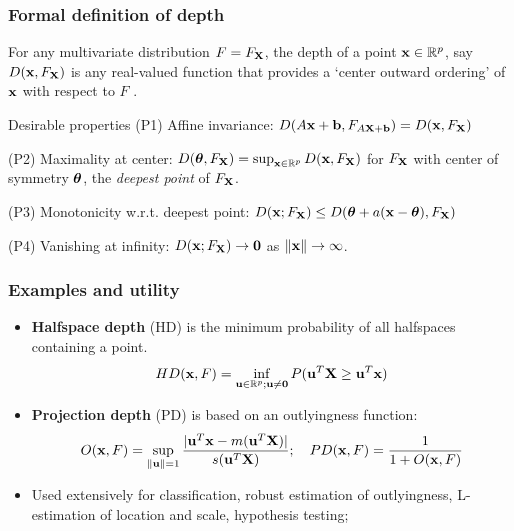 \documentclass[handout,10pt]{beamer}
\begin{document}
\begin{frame}
\frametitle{Formal definition of depth}
For any multivariate distribution $F = F_{\mathbf{X}}$, the depth of a point ${\bf{x}} \in \mathbb{R}^p$, say $D({\bf{x}}, F_{\mathbf{X}})$ is any real-valued function that provides a `center outward ordering' of ${\bf{x}}$ with respect to $F$ \citep{zuo00}.

\vspace{.5cm}
\begin{block}{Desirable properties \citep{liu90}}
(P1) {\colbit Affine invariance}: $D(A{\bf{x}} + {\bf{b}}, F_{A{\mathbf{X}}+{\bf{b}}}) = D({\bf{x}}, F_{\mathbf{X}})$
\vspace{.2cm}

(P2) {\colbit Maximality at center}: $D({\boldsymbol{\theta}}, F_{\mathbf{X}}) = \sup_{{\bf{x}}\in \mathbb{R}^p} D({\bf{x}}, F_{\mathbf{X}})$ for $F_{\mathbf{X}}$ with center of symmetry ${\boldsymbol{\theta}}$, the \textit{deepest point} of $F_{\mathbf{X}}$.
\vspace{.2cm}

(P3) {\colbit Monotonicity w.r.t. deepest point}: $D({\bf{x}}; F_{\mathbf{X}}) \leq D({\boldsymbol{\theta}} + a({\bf{x}} - {\boldsymbol{\theta}}), F_{\mathbf{X}})$
\vspace{.5cm}

(P4) {\colbit Vanishing at infinity}: $D({\bf{x}}; F_{\mathbf{X}}) \rightarrow \bf0$ as $\|{\bf{x}}\| \rightarrow \infty $.
\end{block}
\end{frame}


\begin{frame}
\frametitle{Examples and utility}
\begin{itemize}
\item \textbf{Halfspace depth} (HD) \citep{tukey75} is the minimum probability of all halfspaces containing a point.
$$ HD({\bf{x}}, F)  = \inf_{{\bf{u}} \in \mathbb{R}^p; {\bf{u}} \neq \bf0} P({\bf{u}}^T {\mathbf{X}} \geq {\bf{u}}^T {\bf{x}}) $$

\item \textbf{Projection depth} (PD) \citep{zuo03} is based on an outlyingness function:
$$ O({\bf{x}}, F) = \sup_{\| {\bf{u}} \| = 1} \frac{| {\bf{u}}^T{\bf{x}} - m({\bf{u}}^T{\mathbf{X}})|}{s({\bf{u}}^T{\mathbf{X}})}; \quad PD({\bf{x}}, F) = \frac{1}{1+O({\bf{x}}, F)} $$

\item Used extensively for classification, robust estimation of outlyingness, L-estimation of location and scale, hypothesis testing;

\end{itemize}
\end{frame}
\end{document}
